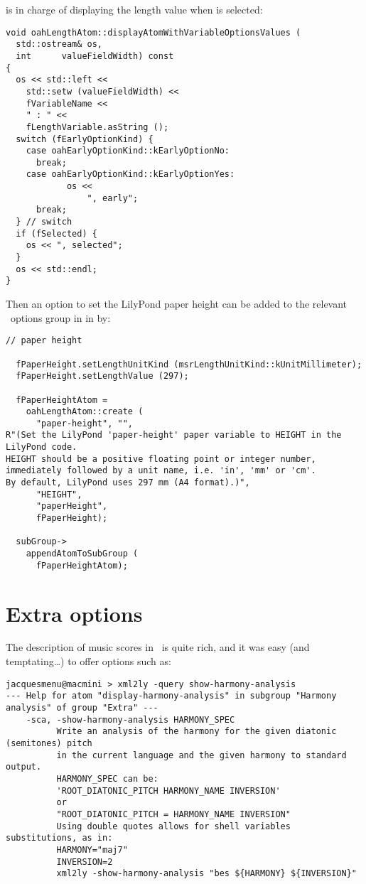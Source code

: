  is in charge of displaying the length value when  is selected:
\begin{lstlisting}[language=CPlusPlus]
void oahLengthAtom::displayAtomWithVariableOptionsValues (
  std::ostream& os,
  int      valueFieldWidth) const
{
  os << std::left <<
    std::setw (valueFieldWidth) <<
    fVariableName <<
    " : " <<
    fLengthVariable.asString ();
  switch (fEarlyOptionKind) {
    case oahEarlyOptionKind::kEarlyOptionNo:
      break;
    case oahEarlyOptionKind::kEarlyOptionYes:
			os <<
				", early";
      break;
  } // switch
  if (fSelected) {
    os << ", selected";
  }
  os << std::endl;
}
\end{lstlisting}

Then an option to set the LilyPond paper height can be added to the relevant \oahRepr\ options group in  in  by:
\begin{lstlisting}[language=CPlusPlus]
  // paper height

  fPaperHeight.setLengthUnitKind (msrLengthUnitKind::kUnitMillimeter);
  fPaperHeight.setLengthValue (297);

  fPaperHeightAtom =
    oahLengthAtom::create (
      "paper-height", "",
R"(Set the LilyPond 'paper-height' paper variable to HEIGHT in the LilyPond code.
HEIGHT should be a positive floating point or integer number,
immediately followed by a unit name, i.e. 'in', 'mm' or 'cm'.
By default, LilyPond uses 297 mm (A4 format).)",
      "HEIGHT",
      "paperHeight",
      fPaperHeight);

  subGroup->
    appendAtomToSubGroup (
      fPaperHeightAtom);
\end{lstlisting}


\section{Extra options}

The description of music scores in \mf\ is quite rich, and it was easy (and temptating\dots) to offer options such as:
\begin{lstlisting}[language=Terminal]
jacquesmenu@macmini > xml2ly -query show-harmony-analysis
--- Help for atom "display-harmony-analysis" in subgroup "Harmony analysis" of group "Extra" ---
    -sca, -show-harmony-analysis HARMONY_SPEC
          Write an analysis of the harmony for the given diatonic (semitones) pitch
          in the current language and the given harmony to standard output.
          HARMONY_SPEC can be:
          'ROOT_DIATONIC_PITCH HARMONY_NAME INVERSION'
          or
          "ROOT_DIATONIC_PITCH = HARMONY_NAME INVERSION"
          Using double quotes allows for shell variables substitutions, as in:
          HARMONY="maj7"
          INVERSION=2
          xml2ly -show-harmony-analysis "bes ${HARMONY} ${INVERSION}"
\end{lstlisting}

